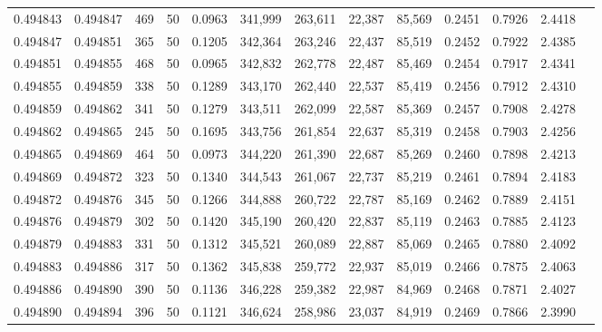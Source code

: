 \begin{tabular}{rrrrrrrrrrrrr}
0.494843 & 0.494847 &   469 &  50 &                                     0.0963 & 341,999 & 263,611 &  22,387 &  85,569 & 0.2451 & 0.7926 & 2.4418 \\
0.494847 & 0.494851 &   365 &  50 &                                     0.1205 & 342,364 & 263,246 &  22,437 &  85,519 & 0.2452 & 0.7922 & 2.4385 \\
0.494851 & 0.494855 &   468 &  50 &                                     0.0965 & 342,832 & 262,778 &  22,487 &  85,469 & 0.2454 & 0.7917 & 2.4341 \\
0.494855 & 0.494859 &   338 &  50 &                                     0.1289 & 343,170 & 262,440 &  22,537 &  85,419 & 0.2456 & 0.7912 & 2.4310 \\
0.494859 & 0.494862 &   341 &  50 &                                     0.1279 & 343,511 & 262,099 &  22,587 &  85,369 & 0.2457 & 0.7908 & 2.4278 \\
0.494862 & 0.494865 &   245 &  50 &                                     0.1695 & 343,756 & 261,854 &  22,637 &  85,319 & 0.2458 & 0.7903 & 2.4256 \\
0.494865 & 0.494869 &   464 &  50 &                                     0.0973 & 344,220 & 261,390 &  22,687 &  85,269 & 0.2460 & 0.7898 & 2.4213 \\
0.494869 & 0.494872 &   323 &  50 &                                     0.1340 & 344,543 & 261,067 &  22,737 &  85,219 & 0.2461 & 0.7894 & 2.4183 \\
0.494872 & 0.494876 &   345 &  50 &                                     0.1266 & 344,888 & 260,722 &  22,787 &  85,169 & 0.2462 & 0.7889 & 2.4151 \\
0.494876 & 0.494879 &   302 &  50 &                                     0.1420 & 345,190 & 260,420 &  22,837 &  85,119 & 0.2463 & 0.7885 & 2.4123 \\
0.494879 & 0.494883 &   331 &  50 &                                     0.1312 & 345,521 & 260,089 &  22,887 &  85,069 & 0.2465 & 0.7880 & 2.4092 \\
0.494883 & 0.494886 &   317 &  50 &                                     0.1362 & 345,838 & 259,772 &  22,937 &  85,019 & 0.2466 & 0.7875 & 2.4063 \\
0.494886 & 0.494890 &   390 &  50 &                                     0.1136 & 346,228 & 259,382 &  22,987 &  84,969 & 0.2468 & 0.7871 & 2.4027 \\
0.494890 & 0.494894 &   396 &  50 &                                     0.1121 & 346,624 & 258,986 &  23,037 &  84,919 & 0.2469 & 0.7866 & 2.3990 \\

\end{tabular}
